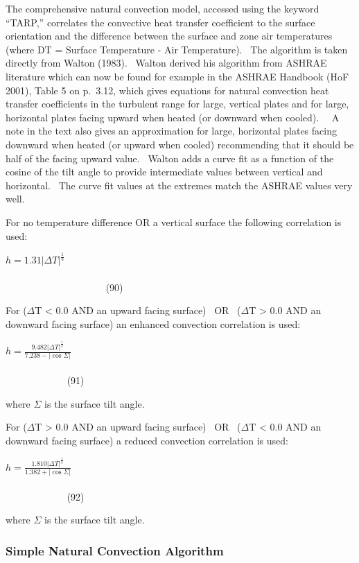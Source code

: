 The comprehensive natural convection model, accessed using the keyword ``TARP,'' correlates the convective heat transfer coefficient to the surface orientation and the difference between the surface and zone air temperatures (where DT = Surface Temperature - Air Temperature).~ The algorithm is taken directly from Walton (1983).~ Walton derived his algorithm from ASHRAE literature which can now be found for example in the ASHRAE Handbook (HoF 2001), Table 5 on p.~3.12, which gives equations for natural convection heat transfer coefficients in the turbulent range for large, vertical plates and for large, horizontal plates facing upward when heated (or downward when cooled).~~ A note in the text also gives an approximation for large, horizontal plates facing downward when heated (or upward when cooled) recommending that it should be half of the facing upward value.~ Walton adds a curve fit as a function of the cosine of the tilt angle to provide intermediate values between vertical and horizontal.~ The curve fit values at the extremes match the ASHRAE values very well.

For no temperature difference OR a vertical surface the following correlation is used:

\(h = 1.31{\left| {\Delta T} \right|^{\frac{1}{3}}}\) ~~~~~~~~~~~~~~~~~~~~~~~~~~~~~~~~~~~~~~~~~~~~~~~~~~~~~~~~~~~~~~~~~~~~~~~~~~~~~~~~~~~~~~~~~~~~ (90)

For ($\Delta$T \textless{} 0.0 AND an upward facing surface)~ OR~ ($\Delta$T \textgreater{} 0.0 AND an downward facing surface) an enhanced convection correlation is used:

\(h = \frac{{9.482{{\left| {\Delta T} \right|}^{\frac{1}{3}}}}}{{7.238 - \left| {\cos \Sigma } \right|}}\) ~~~~~~~~~~~~~~~~~~~~~~~~~~~~~~~~~~~~~~~~~~~~~~~~~~~~~~~~~~~~~~~~~~~~~~~~~~~~~~~~~~~~ (91)

where $\Sigma$ is the surface tilt angle.

For ($\Delta$T \textgreater{} 0.0 AND an upward facing surface)~ OR~ ($\Delta$T \textless{} 0.0 AND an downward facing surface) a reduced convection correlation is used:

\(h = \frac{{1.810{{\left| {\Delta T} \right|}^{\frac{1}{3}}}}}{{1.382 + \left| {\cos \Sigma } \right|}}\) ~~~~~~~~~~~~~~~~~~~~~~~~~~~~~~~~~~~~~~~~~~~~~~~~~~~~~~~~~~~~~~~~~~~~~~~~~~~~~~~~~~~~ (92)

where $\Sigma$ is the surface tilt angle.

\subsubsection{Simple Natural Convection Algorithm}\label{simple-natural-convection-algorithm}

